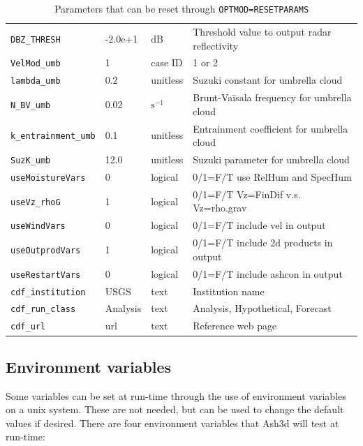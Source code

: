 \begin{table}[htbp]
\begin{center}
\begin{tabular}{| l | l | l | l |}
\texttt{DBZ\_THRESH}       & -2.0e+1  & $\mathrm{dB}$      &  Threshold value to output radar reflectivity \\
\texttt{VelMod\_umb}       & 1        & case ID            &  1 or 2 \\
\texttt{lambda\_umb}       & 0.2      & unitless           &  Suzuki constant for umbrella cloud \\
\texttt{N\_BV\_umb}        & 0.02     & $\mathrm{s^{-1}}$  &  Brunt-Va\"isala frequency for umbrella cloud \\
\texttt{k\_entrainment\_umb} & 0.1    & unitless           &  Entrainment coefficient for umbrella cloud \\
\texttt{SuzK\_umb}         & 12.0     & unitless           &  Suzuki parameter for umbrella cloud \\
\texttt{useMoistureVars}   & 0        & logical            &  0/1=F/T use RelHum and SpecHum \\
\texttt{useVz\_rhoG}       & 1        & logical            &  0/1=F/T Vz=FinDif v.s. Vz=rho.grav \\
\texttt{useWindVars}       & 0        & logical            &  0/1=F/T include vel in output \\
\texttt{useOutprodVars}    & 1        & logical            &  0/1=F/T include 2d products in output \\
\texttt{useRestartVars}    & 0        & logical            &  0/1=F/T include ashcon in output \\
\texttt{cdf\_institution}  & USGS     & text               &  Institution name \\
\texttt{cdf\_run\_class}   & Analysis & text               &  Analysis, Hypothetical, Forecast \\
\texttt{cdf\_url}          & url      & text               &  Reference web page \\
\hline
\end{tabular}
\caption{\label{tab:ResetParam}Parameters that can be reset through \texttt{OPTMOD=RESETPARAMS}}
\end{center}
\end{table}
\normalsize

\subsection{Environment variables}
Some variables can be set at run-time through the use of environment variables on a unix
system.  These are not needed, but can be used to change the default values if desired.
There are four environment variables that Ash3d will test at run-time:



